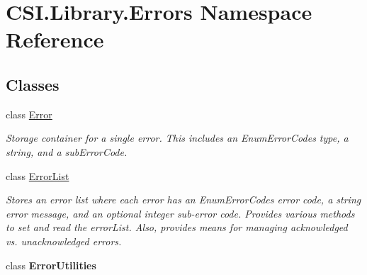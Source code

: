 \hypertarget{namespace_c_s_i_1_1_library_1_1_errors}{}\section{C\+S\+I.\+Library.\+Errors Namespace Reference}
\label{namespace_c_s_i_1_1_library_1_1_errors}
\subsection*{Classes}
\begin{DoxyCompactItemize}
\item 
class \mbox{\hyperlink{class_c_s_i_1_1_library_1_1_errors_1_1_error}{Error}}
\begin{DoxyCompactList}\small\item\em Storage container for a single error. This includes an Enum\+Error\+Codes type, a string, and a sub\+Error\+Code. \end{DoxyCompactList}\item 
class \mbox{\hyperlink{class_c_s_i_1_1_library_1_1_errors_1_1_error_list}{Error\+List}}
\begin{DoxyCompactList}\small\item\em Stores an error list where each error has an Enum\+Error\+Codes error code, a string error message, and an optional integer sub-\/error code. Provides various methods to set and read the error\+List. Also, provides means for managing acknowledged vs. unacknowledged errors. \end{DoxyCompactList}\item 
class {\bfseries Error\+Utilities}
\end{DoxyCompactItemize}
